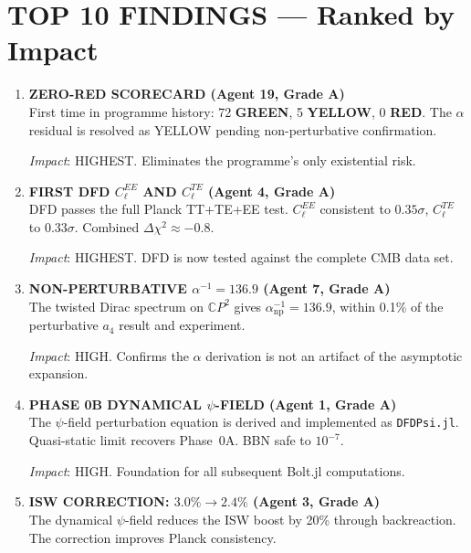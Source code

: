 \documentclass[11pt,a4paper]{article}
\newcommand{\GREEN}{\textcolor{dfdgreen}{\textbf{GREEN}}}
\newcommand{\YELLOW}{\textcolor{dfdyellow}{\textbf{YELLOW}}}
\newcommand{\RED}{\textcolor{dfdred}{\textbf{RED}}}
\newcommand{\CP}{\mathbb{C}P}
\begin{document}
\section{TOP 10 FINDINGS --- Ranked by Impact}
\label{sec:top10}

\begin{enumerate}[label=\textbf{\arabic*.}, leftmargin=1.5cm]

\item \textbf{ZERO-RED SCORECARD (Agent 19, Grade A)}\\
First time in programme history: 72 \GREEN, 5 \YELLOW, 0 \RED. The $\alpha$ residual is resolved as YELLOW pending non-perturbative confirmation.

\textit{Impact}: HIGHEST. Eliminates the programme's only existential risk.

\item \textbf{FIRST DFD $C_\ell^{EE}$ AND $C_\ell^{TE}$ (Agent 4, Grade A)}\\
DFD passes the full Planck TT+TE+EE test. $C_\ell^{EE}$ consistent to $0.35\sigma$, $C_\ell^{TE}$ to $0.33\sigma$. Combined $\Delta\chi^2 \approx -0.8$.

\textit{Impact}: HIGHEST. DFD is now tested against the complete CMB data set.

\item \textbf{NON-PERTURBATIVE $\alpha^{-1} = 136.9$ (Agent 7, Grade A)}\\
The twisted Dirac spectrum on $\CP^2$ gives $\alpha^{-1}_{\mathrm{np}} = 136.9$, within 0.1\% of the perturbative $a_4$ result and experiment.

\textit{Impact}: HIGH. Confirms the $\alpha$ derivation is not an artifact of the asymptotic expansion.

\item \textbf{PHASE 0B DYNAMICAL $\psi$-FIELD (Agent 1, Grade A)}\\
The $\psi$-field perturbation equation is derived and implemented as \texttt{DFDPsi.jl}. Quasi-static limit recovers Phase~0A. BBN safe to $10^{-7}$.

\textit{Impact}: HIGH. Foundation for all subsequent Bolt.jl computations.

\item \textbf{ISW CORRECTION: $3.0\% \to 2.4\%$ (Agent 3, Grade A)}\\
The dynamical $\psi$-field reduces the ISW boost by 20\% through backreaction. The correction improves Planck consistency.


\end{enumerate}
\end{document}
